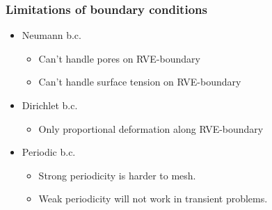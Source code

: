 \documentclass[11pt]{beamer} %
\begin{document}
\begin{frame}
 \frametitle{Limitations of boundary conditions}
 \begin{itemize}
  \item Neumann b.c.
   \begin{itemize}
     \item Can't handle pores on RVE-boundary
     \item Can't handle surface tension on RVE-boundary
   \end{itemize}
  \item Dirichlet b.c.
   \begin{itemize}
    \item Only proportional deformation along RVE-boundary
   \end{itemize}
  \item Periodic b.c.
   \begin{itemize}
    \item Strong periodicity is harder to mesh.
    \item Weak periodicity will not work in transient problems.
   \end{itemize}
 \end{itemize}
\end{frame}


\end{document}
